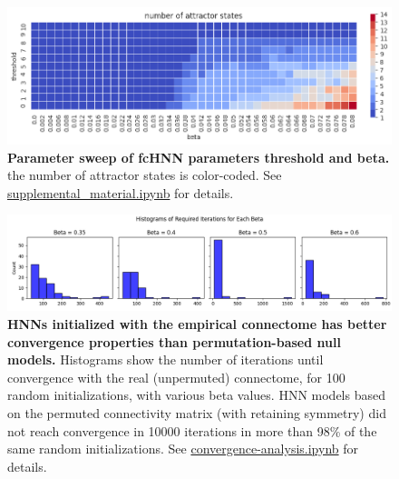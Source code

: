 \documentclass{article}
\begin{document}
\begin{figure}[!htbp]
\centering
\includegraphics[width=0.7\linewidth]{files/att_state_emergence_-cf0e8c7e2b26295d00f2ddbe58504c62.png}
\caption[]{\textbf{Parameter sweep of fcHNN parameters threshold and beta.} the number of attractor states is color-coded. See \href{https://github.com/pni-lab/connattractor/blob/master/notebooks/supplemental\_material.ipynb}{supplemental\_material.ipynb} for details.}
\label{si_att_state_emergence_over_beta}
\end{figure}

\begin{figure}[!htbp]
\centering
\includegraphics[width=0.7\linewidth]{files/si_convergence-eec1cb017330ad571e319c39f8b0865b.png}
\caption[]{\textbf{HNNs initialized with the empirical connectome has better convergence properties than permutation-based null models.} Histograms show the number of iterations until convergence with the real (unpermuted) connectome, for 100 random initializations, with various beta values. HNN models based on the permuted connectivity matrix (with retaining symmetry) did not reach convergence in 10000 iterations in more than 98\% of the same random initializations. See \href{https://github.com/pni-lab/connattractor/blob/master/notebooks/convergence\_analysis.ipynb}{convergence-analysis.ipynb} for details.}
\label{si_convergence}
\end{figure}
\end{document}
